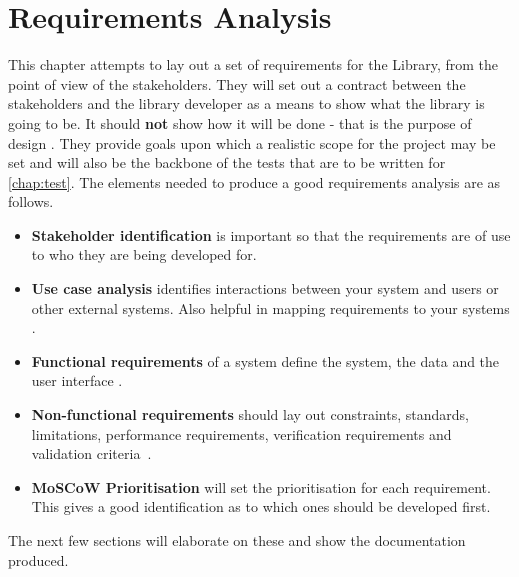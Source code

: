 \documentclass[11pt,oneside]{report}
\begin{document}
	\chapter{Requirements Analysis}\label{chap:req}
	This chapter attempts to lay out a set of requirements for the Library, from the point of view of the stakeholders.
	They will set out a contract between the stakeholders and the library developer as a means to show what the library is going to be. It should \textbf{not} show how it will be done - that is the purpose of design \cite{book:dawson}.
	They provide goals upon which a realistic scope for the project may be set and will also be the backbone of the tests that are to be written for \autoref{chap:test}.
	The elements needed to produce a good requirements analysis are as follows.
	\begin{itemize}
		\item \textbf{Stakeholder identification} is important so that the requirements are of use to who they are being developed for.
		\item \textbf{Use case analysis} identifies interactions between your system and users or other external systems. Also helpful in mapping requirements to your systems \cite{book:uml}.
		\item \textbf{Functional requirements} of a system define the system, the data and the user interface \cite{book:dawson}.
		\item \textbf{Non-functional requirements} should lay out constraints, standards, limitations, performance requirements, verification requirements and validation criteria~\cite{book:dawson}.
		\item \textbf{MoSCoW Prioritisation} will set the prioritisation for each requirement. This gives a good identification as to which ones should be developed first.
	\end{itemize}
	The next few sections will elaborate on these and show the documentation produced. 
		
\end{document}
